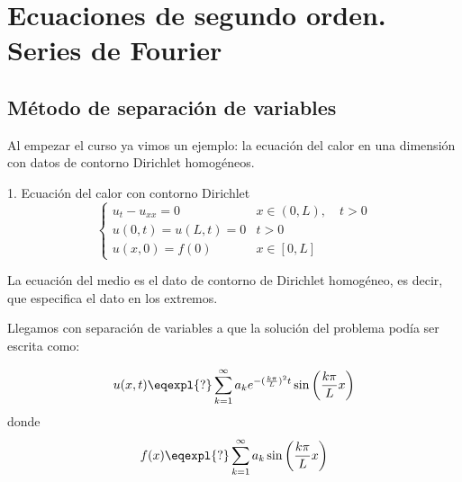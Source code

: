 
\chapter{Ecuaciones de segundo orden. Series de Fourier}
\label{chap:EcuacionesSegundoOrden}

\section{Método de separación de variables}

	Al empezar el curso ya vimos un ejemplo: la ecuación del calor en una dimensión con datos de contorno Dirichlet homogéneos.

	\begin{example}{1. Ecuación del calor con contorno Dirichlet}
		\[
		\begin{cases}
		u_t - u_{xx} = 0 & x \in (0,L), \quad t > 0 \\
		u(0,t) = u(L,t) = 0 & t > 0 \\
		u(x,0) = f(0) & x \in [0,L]
		\end{cases}
		\]

		La ecuación del medio es el dato de contorno de Dirichlet homogéneo, es decir, que especifica el dato en los extremos.

		Llegamos con separación de variables a que la solución del problema podía ser escrita como:

		\[ u(x,t) \eqexpl{?} \sum^{\infty}_{k=1} a_k e^{-(\frac{k\pi}{L})^2 t} \sin \left( \frac{k\pi}{L} x \right) \]
		donde
		\[ f(x) \eqexpl{?} \sum^{\infty}_{k=1} a_k \sin \left( \frac{k\pi}{L}x \right) \]
	\end{example}


